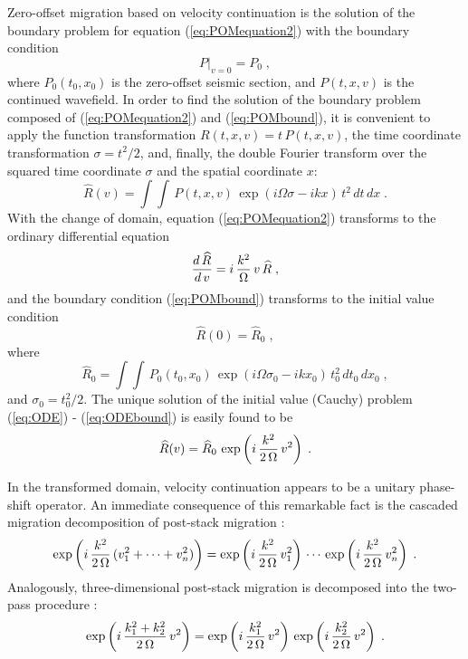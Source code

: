 Zero-offset migration based on velocity continuation is the solution
of the boundary problem for equation (\ref{eq:POMequation2}) with the
boundary condition
\begin{equation}
\left.P\right|_{v=0} = P_0\;,
\label{eq:POMbound} 
\end{equation}
where $P_0(t_0,x_0)$ is the zero-offset seismic section, and
$P(t,x,v)$ is the continued wavefield. In order to find the solution
of the boundary problem composed of (\ref{eq:POMequation2}) and
(\ref{eq:POMbound}), it is convenient to apply the function
transformation $R(t,x,v) = t\,P(t,x,v)$, the time coordinate
transformation $\sigma = t^2/2$, and, finally, the double Fourier
transform over the squared time coordinate $\sigma$ and the spatial
coordinate $x$:
\begin{equation}
\widehat{R}(v) = \int \int\,P(t,x,v)\,
\exp(i \Omega \sigma - i k x )\,t^2\,dt\,dx\;.
\label{eq:FTK} 
\end{equation}
With the change of domain, equation (\ref{eq:POMequation2}) transforms
to the ordinary differential equation
\begin{equation}
{{d\,\widehat{R}} \over {d\,v}} = 
i\,{k^2 \over \Omega}\,v\,\widehat{R}\;,
\label{eq:ODE} 
\end{equation}
and the boundary condition (\ref{eq:POMbound}) transforms to the initial
value condition
\begin{equation}
\widehat{R}(0) = \widehat{R}_0\;, 
\label{eq:ODEbound} 
\end{equation}
where 
\begin{equation}
\widehat{R}_0 = \int \int\,P_0(t_0,x_0)\,
\exp(i \Omega \sigma_0 - i k x_0 )\,t_0^2\,dt_0\,dx_0\;,
\label{eq:FTK0}
\end{equation}
and $\sigma_0 = t_0^2/2$.  The unique solution of the initial value
(Cauchy) problem (\ref{eq:ODE}) - (\ref{eq:ODEbound}) is easily found to be
\begin{equation}
\widehat{R}(v) = \widehat{R}_0\,
\exp\left( i\,{{k^2} \over {2\,\Omega}}\,v^2\right)\;.
\label{eq:ODEsolution} 
\end{equation}

In the transformed domain, velocity continuation appears to be a unitary
phase-shift operator. An immediate consequence of this remarkable fact is the
cascaded migration decomposition of post-stack migration
\cite[]{GEO52-05-06180643}:
\begin{equation}
\exp\left( i\,{{k^2} \over {2\,\Omega}}\,
(v_1^2 +  \cdots + v_n^2)\right) =
\exp\left( i\,{{k^2} \over {2\,\Omega}}\,v_1^2\right)\,\cdots\,
\exp\left( i\,{{k^2} \over {2\,\Omega}}\,v_n^2\right)\;.
\label{eq:cascaded} 
\end{equation}
Analogously, three-dimensional post-stack migration is decomposed
into the two-pass procedure \cite[]{GPR31-01-00340056}:
\begin{equation}
\exp\left( i\,{{k_1^2+k_2^2} \over {2\,\Omega}}\,v^2\right) =
\exp\left( i\,{{k_1^2} \over {2\,\Omega}}\,v^2\right)\,
\exp\left( i\,{{k_2^2} \over {2\,\Omega}}\,v^2\right)\;.
\label{eq:two-pass}
\end{equation}

